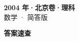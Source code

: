 \documentclass[zihao=-4, a4paper]{ctexart}
\begin{document}
\begin{center}
  {\Large\bfseries 2004 年·北京卷·理科}\\[4pt]
  {\large 数学 · 简答版}
\end{center}
\medskip
{}

\clearpage
{}
\begin{center}{\Large\bfseries 答案速查}\end{center}
\medskip

\end{document}
